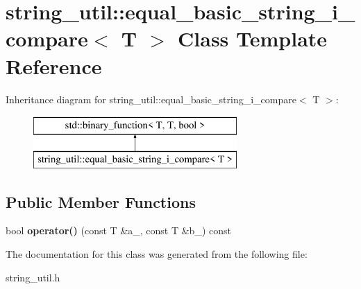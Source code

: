 \section{string\+\_\+util\+:\+:equal\+\_\+basic\+\_\+string\+\_\+i\+\_\+compare$<$ T $>$ Class Template Reference}
\label{classstring__util_1_1equal__basic__string__i__compare}
Inheritance diagram for string\+\_\+util\+:\+:equal\+\_\+basic\+\_\+string\+\_\+i\+\_\+compare$<$ T $>$\+:\begin{figure}[H]
\begin{center}
\leavevmode
\includegraphics[height=2.000000cm]{classstring__util_1_1equal__basic__string__i__compare}
\end{center}
\end{figure}
\subsection*{Public Member Functions}
\begin{DoxyCompactItemize}
\item 
bool {\bfseries operator()} (const T \&a\+\_\+, const T \&b\+\_\+) const \label{classstring__util_1_1equal__basic__string__i__compare_a29fabe519d28908f5b72dcb799cac64f}

\end{DoxyCompactItemize}


The documentation for this class was generated from the following file\+:\begin{DoxyCompactItemize}
\item 
string\+\_\+util.\+h\end{DoxyCompactItemize}
